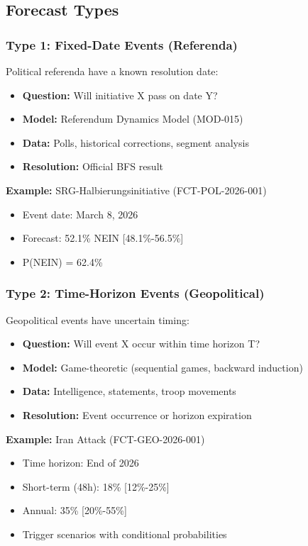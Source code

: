 \subsection{Forecast Types}

\subsubsection{Type 1: Fixed-Date Events (Referenda)}

Political referenda have a known resolution date:

\begin{itemize}
    \item \textbf{Question:} Will initiative X pass on date Y?
    \item \textbf{Model:} Referendum Dynamics Model (MOD-015)
    \item \textbf{Data:} Polls, historical corrections, segment analysis
    \item \textbf{Resolution:} Official BFS result
\end{itemize}

\textbf{Example:} SRG-Halbierungsinitiative (FCT-POL-2026-001)
\begin{itemize}
    \item Event date: March 8, 2026
    \item Forecast: 52.1\% NEIN [48.1\%-56.5\%]
    \item P(NEIN) = 62.4\%
\end{itemize}

\subsubsection{Type 2: Time-Horizon Events (Geopolitical)}

Geopolitical events have uncertain timing:

\begin{itemize}
    \item \textbf{Question:} Will event X occur within time horizon T?
    \item \textbf{Model:} Game-theoretic (sequential games, backward induction)
    \item \textbf{Data:} Intelligence, statements, troop movements
    \item \textbf{Resolution:} Event occurrence or horizon expiration
\end{itemize}

\textbf{Example:} Iran Attack (FCT-GEO-2026-001)
\begin{itemize}
    \item Time horizon: End of 2026
    \item Short-term (48h): 18\% [12\%-25\%]
    \item Annual: 35\% [20\%-55\%]
    \item Trigger scenarios with conditional probabilities
\end{itemize}

